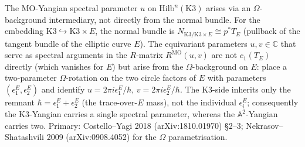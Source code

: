 \begin{remark}
\label{rem:fsc-K3-APCY20-spectral}
The MO-Yangian spectral parameter $u$ on $\mathrm{Hilb}^n(\mathrm K3)$
arises via an $\Omega$-background intermediary, not directly from the
normal bundle. For the embedding
$\mathrm{K3} \hookrightarrow \mathrm{K3} \times E$, the normal bundle
is $N_{\mathrm{K3}/\mathrm{K3} \times E} \cong p^* T_E$ (pullback of
the tangent bundle of the elliptic curve $E$). The equivariant
parameters $u, v \in \mathbb{C}$ that serve as spectral arguments in
the $R$-matrix $R^{\mathrm{MO}}(u, v)$ are not $c_1(T_E)$ directly
(which vanishes for $E$) but arise from the $\Omega$-background on
$E$: place a two-parameter $\Omega$-rotation on the two circle
factors of $E$ with parameters $(\epsilon_1^E, \epsilon_2^E)$ and
identify $u = 2\pi i \epsilon_1^E/\hbar$, $v = 2\pi i
\epsilon_2^E/\hbar$. The K3-side inherits only the remnant
$\hbar = \epsilon_1^E + \epsilon_2^E$ (the trace-over-$E$ mass), not
the individual $\epsilon_i^E$; consequently the K3-Yangian carries a
single spectral parameter, whereas the $\mathbb A^2$-Yangian carries
two. Primary: Costello--Yagi 2018 (arXiv:1810.01970) \S2--3;
Nekrasov--Shatashvili 2009 (arXiv:0908.4052) for the $\Omega$
parametrisation.
\end{remark}

